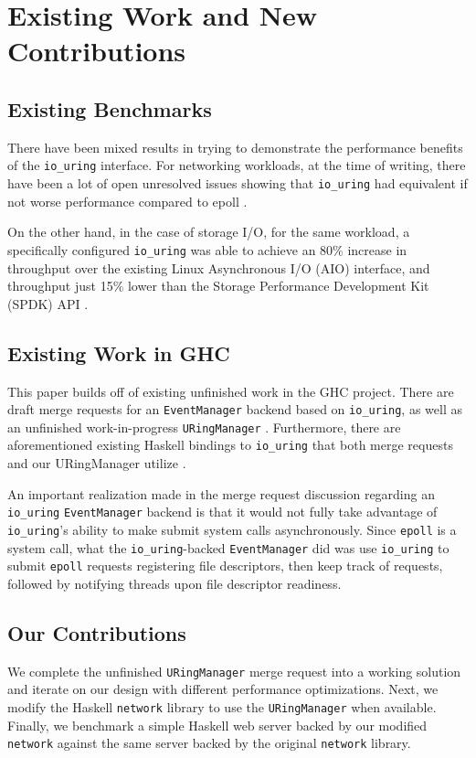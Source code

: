 \chapter{Existing Work and New Contributions}

\section{Existing Benchmarks} 
There have been mixed results in trying to demonstrate the performance benefits of the \texttt{io\_uring} interface. For networking workloads, at the time of writing, there have been a lot of open unresolved issues showing that \texttt{io\_uring} had equivalent if not worse performance compared to epoll \cite{gh_uring_issue_1,gh_uring_issue_2,gh_uring_issue_3}.

On the other hand, in the case of storage I/O, for the same workload, a specifically configured \texttt{io\_uring} was able to achieve an 80\% increase in throughput over the existing Linux Asynchronous I/O (AIO) interface, and throughput just 15\% lower than the Storage Performance Development Kit (SPDK) API \cite{understandingStorage}.


\section{Existing Work in GHC}
This paper builds off of existing unfinished work in the GHC project.
There are draft merge requests for an \texttt{EventManager} \cite{uring_event_manager}
backend based on \texttt{io\_uring}, as well as an unfinished work-in-progress
\texttt{URingManager} \cite{uring_manager_original}. Furthermore, there are aforementioned existing Haskell
bindings to \texttt{io\_uring} that both merge requests and our URingManager utilize
\cite{uring_bindings}.

An important realization made in the merge request discussion regarding
an \texttt{io\_uring} \texttt{EventManager} backend is that it would not fully take advantage
of \texttt{io\_uring}’s ability to make submit system calls asynchronously.
Since \texttt{epoll} is a system call, what the \texttt{io\_uring}-backed \texttt{EventManager}
did was use \texttt{io\_uring} to submit \texttt{epoll} requests registering
file descriptors, then keep track of requests, followed by notifying
threads upon file descriptor readiness.

\section{Our Contributions} 
We complete the unfinished \texttt{URingManager} merge request into a
working solution and iterate on our design with different performance
optimizations. Next, we modify the Haskell \texttt{network} library to use the
\texttt{URingManager} when available. Finally, we benchmark a simple Haskell
web server backed by our modified \texttt{network} against the same server
backed by the original \texttt{network} library.